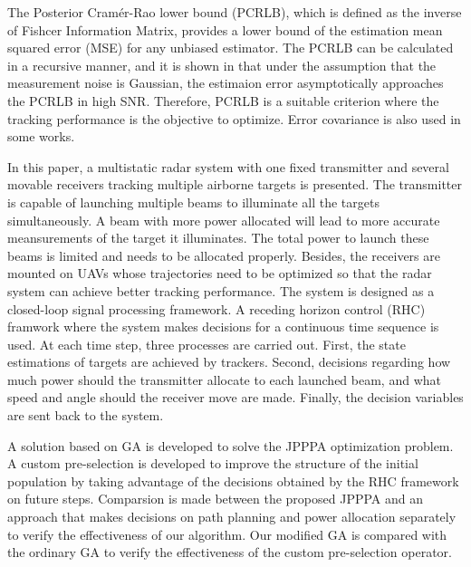 \documentclass[12pt,journal,draftclsnofoot,onecolumn]{IEEEtran}
\begin{document}
The Posterior Cramér-Rao lower bound (PCRLB), which is defined as the inverse of Fishcer Information Matrix, provides a lower bound of the estimation mean squared error (MSE) for any unbiased estimator. The PCRLB can be calculated in a recursive manner\cite{tichavsky1998posterior}, and it is shown in\cite{niu2012target} that under the assumption that the measurement noise is Gaussian, the estimaion error asymptotically approaches the PCRLB in high SNR. Therefore, PCRLB is a suitable criterion where the tracking performance is the objective to optimize\cite{hernandez2004multisensor,tharmarasa2007pcrlb,punithakumar2006multisensor}. Error covariance is also used in some works\cite{douganccay2010single}. 

In this paper, a multistatic radar system with one fixed transmitter and several movable receivers tracking multiple airborne targets is presented. The transmitter is capable of launching multiple beams to illuminate all the targets simultaneously. A beam with more power allocated will lead to more accurate meansurements of the target it illuminates. The total power to launch these beams is limited and needs to be allocated properly. Besides, the receivers are mounted on UAVs whose trajectories need to be optimized so that the radar system can achieve better tracking performance. The system is designed as a closed-loop signal processing framework. A receding horizon control (RHC) framwork\cite{frew2005receding} where the system makes decisions for a continuous time sequence is used. %
At each time step, three processes are carried out. First, the state estimations of targets are achieved by trackers. Second, decisions regarding how much power should the transmitter allocate to each launched beam, and what speed and angle should the receiver move are made. Finally, the decision variables are sent back to the system.

A solution based on GA is developed to solve the JPPPA optimization problem. A custom pre-selection is developed to improve the structure of the initial population by taking advantage of the decisions obtained by the RHC framework on future steps. Comparsion is made between the proposed JPPPA and an approach that makes decisions on path planning and power allocation separately to verify the effectiveness of our algorithm. Our modified GA is compared with the ordinary GA to verify the effectiveness of the custom pre-selection operator.
\end{document}
